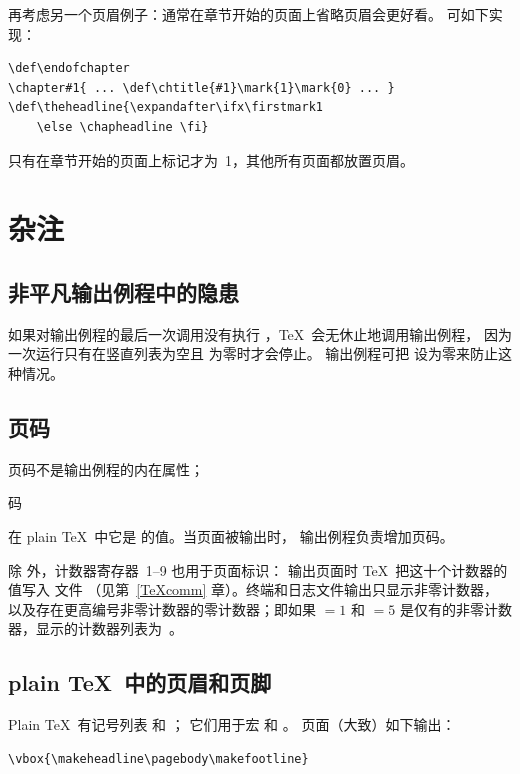 \documentclass[a4paper]{rapport3}
\def\term#1\par{\index{#1}}
\begin{document}
再考虑另一个页眉例子：通常在章节开始的页面上省略页眉会更好看。
可如下实现：
\begin{verbatim}
\def\endofchapter
\chapter#1{ ... \def\chtitle{#1}\mark{1}\mark{0} ... }
\def\theheadline{\expandafter\ifx\firstmark1 
    \else \chapheadline \fi}
\end{verbatim}
只有在章节开始的页面上标记才为~1，其他所有页面都放置页眉。

\section{杂注}

\subsection{非平凡输出例程中的隐患}

如果对输出例程的最后一次调用没有执行 ，\TeX\ 会无休止地调用输出例程，
因为一次运行只有在竖直列表为空且  为零时才会停止。
输出例程可把  设为零来防止这种情况。

\subsection{页码}

页码不是输出例程的内在属性；
\term 页码\par
在 plain \TeX\ 中它是  的值。当页面被输出时，
输出例程负责增加页码。

除  外，计数器寄存器~1--9 也用于页面标识：
输出页面时 \TeX\ 把这十个计数器的值写入  文件
（见第~\ref{TeXcomm} 章）。终端和日志文件输出只显示非零计数器，
以及存在更高编号非零计数器的零计数器；即如果 ${}=1$ 和
${}=5$ 是仅有的非零计数器，显示的计数器列表为~\n{[1.0.0.5]}。

\subsection{plain \TeX\ 中的页眉和页脚}

Plain \TeX\ 有记号列表  和 ；
它们用于宏  和 。
页面（大致）如下输出：
\begin{verbatim}
\vbox{\makeheadline\pagebody\makefootline}
\end{verbatim}
\end{document}
